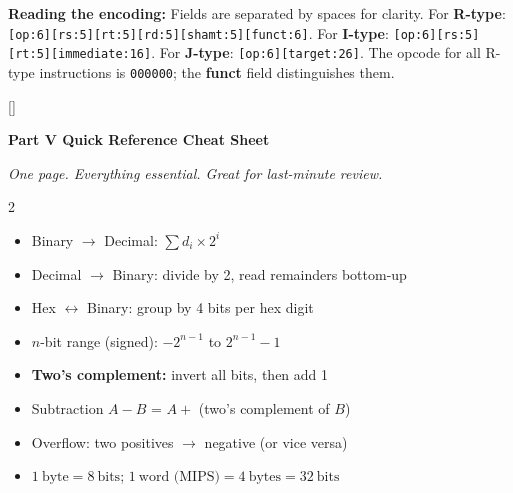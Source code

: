 \documentclass[11pt, letterpaper]{article}
\newcommand{\purplesections}{%
  \titleformat{\section}{\large\bfseries\color{sectionpurple}}{}{0em}{}[\color{sectionpurple}\titlerule]%
  \titleformat{\subsection}{\normalsize\bfseries\color{sectionpurple!80!black}}{}{0em}{}%
}
\newcommand{\partbanner}[3]{%
  \begin{tcolorbox}[colback=#1, colframe=#2, boxrule=1.2pt, arc=4pt,
    left=8pt, right=8pt, top=6pt, bottom=6pt]
    \begin{center}{\LARGE\bfseries #3}\end{center}
  \end{tcolorbox}%
}
\begin{document}
\vspace{4pt}
\begin{tcolorbox}[colback=notebg, colframe=noteborder, arc=3pt, boxrule=1pt]
\textbf{Reading the encoding:} Fields are separated by spaces for clarity.
For \textbf{R-type}: \texttt{[op:6][rs:5][rt:5][rd:5][shamt:5][funct:6]}.
For \textbf{I-type}: \texttt{[op:6][rs:5][rt:5][immediate:16]}.
For \textbf{J-type}: \texttt{[op:6][target:26]}.
The opcode for all R-type instructions is \texttt{000000}; the \textbf{funct} field distinguishes them.
\end{tcolorbox}

\newpage

\purplesections
{}
\partbanner{part3bg}{sectionpurple}{Part V \quad Quick Reference Cheat Sheet}

\vspace{4pt}
\begin{center}\small\itshape One page. Everything essential. Great for last-minute review.\end{center}
\vspace{4pt}

\begin{tcolorbox}[colback=part2bg, colframe=sectiongreen,
  title={\bfseries Binary Arithmetic \& Two's Complement}, arc=3pt, boxrule=1pt]
\footnotesize
\begin{multicols}{2}
\begin{itemize}[noitemsep, leftmargin=*]
  \item Binary $\to$ Decimal: $\sum d_i \times 2^i$
  \item Decimal $\to$ Binary: divide by 2, read remainders bottom-up
  \item Hex $\leftrightarrow$ Binary: group by 4 bits per hex digit
  \item $n$-bit range (signed): $-2^{n-1}$ to $2^{n-1}-1$
\end{itemize}
\columnbreak
\begin{itemize}[noitemsep, leftmargin=*]
  \item \textbf{Two's complement:} invert all bits, then add 1
  \item Subtraction $A - B$ = $A +$ (two's complement of $B$)
  \item Overflow: two positives $\to$ negative (or vice versa)
  \item $1\ \text{byte} = 8\ \text{bits}$; $1\ \text{word (MIPS)} = 4\ \text{bytes} = 32\ \text{bits}$
\end{itemize}
\end{multicols}
\end{tcolorbox}
\end{document}
